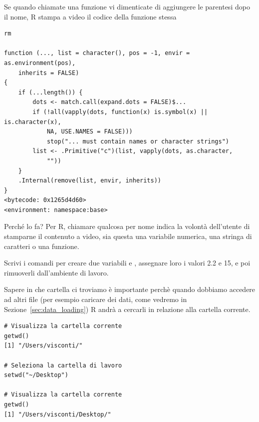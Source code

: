\noindent Se quando chiamate una funzione vi dimenticate di aggiungere le parentesi dopo il nome, R stampa a video il codice della funzione stessa

\begin{lstlisting}[style=Rstyle]
rm

function (..., list = character(), pos = -1, envir = as.environment(pos), 
    inherits = FALSE) 
{
    if (...length()) {
        dots <- match.call(expand.dots = FALSE)$...
        if (!all(vapply(dots, function(x) is.symbol(x) || is.character(x), 
            NA, USE.NAMES = FALSE))) 
            stop("... must contain names or character strings")
        list <- .Primitive("c")(list, vapply(dots, as.character, 
            ""))
    }
    .Internal(remove(list, envir, inherits))
}
<bytecode: 0x1265d4d60>
<environment: namespace:base>
\end{lstlisting}
%
Perch\'e lo fa? Per R, chiamare qualcosa per nome indica la volont\`a dell'utente di stamparne il contenuto a video, sia questa una variabile numerica, una stringa di caratteri o una funzione.


\vspace{0.5cm} 

\begin{exercise}\label{ex2.4}

\noindent
Scrivi i comandi per creare due variabili  e , assegnare loro i valori 2.2 e 15, e poi rimuoverli dall'ambiente di lavoro.

\end{exercise}	

\noindent Sapere in che cartella ci troviamo \`e importante perch\`e quando dobbiamo accedere ad altri file (per esempio caricare dei dati, come vedremo in Sezione~\ref{sec:data_loading}) R andr\`a a cercarli in relazione alla cartella corrente.

\begin{lstlisting}[style=Rstyle]
# Visualizza la cartella corrente
getwd()
[1] "/Users/visconti/"

# Seleziona la cartella di lavoro
setwd("~/Desktop")

# Visualizza la cartella corrente
getwd()
[1] "/Users/visconti/Desktop/"
\end{lstlisting}

